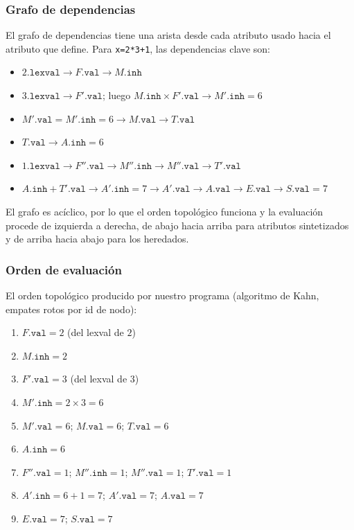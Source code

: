\documentclass[11pt,a4paper]{article}
\begin{document}
\subsubsection*{Grafo de dependencias}

El grafo de dependencias tiene una arista desde cada atributo usado hacia el atributo que define. Para \texttt{x=2*3+1}, las dependencias clave son:

\begin{itemize}[nosep]
  \item $2.\texttt{lexval} \to F.\texttt{val} \to M.\texttt{inh}$
  \item $3.\texttt{lexval} \to F'.\texttt{val}$; luego $M.\texttt{inh} \times F'.\texttt{val} \to M'.\texttt{inh} = 6$
  \item $M'.\texttt{val} = M'.\texttt{inh} = 6 \to M.\texttt{val} \to T.\texttt{val}$
  \item $T.\texttt{val} \to A.\texttt{inh} = 6$
  \item $1.\texttt{lexval} \to F''.\texttt{val} \to M''.\texttt{inh} \to M''.\texttt{val} \to T'.\texttt{val}$
  \item $A.\texttt{inh} + T'.\texttt{val} \to A'.\texttt{inh} = 7 \to A'.\texttt{val} \to A.\texttt{val} \to E.\texttt{val} \to S.\texttt{val} = 7$
\end{itemize}

El grafo es ac\'iclico, por lo que el orden topol\'ogico funciona y la evaluaci\'on procede de izquierda a derecha, de abajo hacia arriba para atributos sintetizados y de arriba hacia abajo para los heredados.

\subsubsection*{Orden de evaluaci\'on}

El orden topol\'ogico producido por nuestro programa (algoritmo de Kahn, empates rotos por id de nodo):

\begin{enumerate}[nosep]
  \item $F.\texttt{val} = 2$ \quad (del lexval de $2$)
  \item $M.\texttt{inh} = 2$
  \item $F'.\texttt{val} = 3$ \quad (del lexval de $3$)
  \item $M'.\texttt{inh} = 2 \times 3 = 6$
  \item $M'.\texttt{val} = 6$; $M.\texttt{val} = 6$; $T.\texttt{val} = 6$
  \item $A.\texttt{inh} = 6$
  \item $F''.\texttt{val} = 1$; $M''.\texttt{inh} = 1$; $M''.\texttt{val} = 1$; $T'.\texttt{val} = 1$
  \item $A'.\texttt{inh} = 6 + 1 = 7$; $A'.\texttt{val} = 7$; $A.\texttt{val} = 7$
  \item $E.\texttt{val} = 7$; $S.\texttt{val} = 7$
\end{enumerate}
\end{document}

